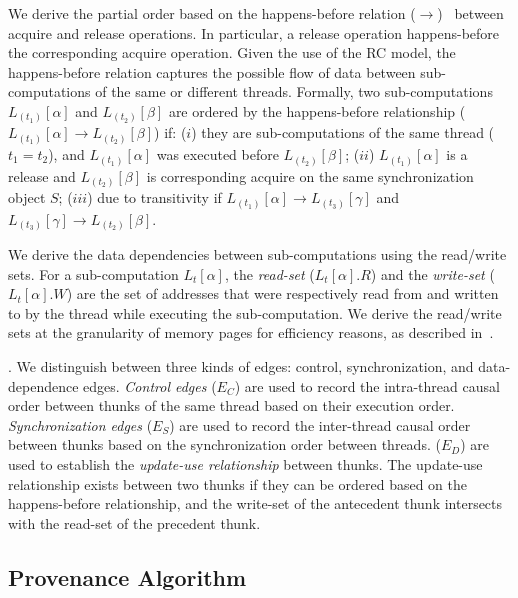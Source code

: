 We derive the partial order based on the happens-before relation
($\rightarrow$)~\cite{djit,fast-track-pldi} between acquire and release operations. In particular, a release
operation happens-before the corresponding acquire operation. Given
the use of the RC model, the happens-before relation
captures the possible flow of data between sub-computations of the same or different threads.
Formally, two sub-computations $L_{(t_1)}[\alpha]$ and
$L_{(t_2)}[\beta]$ are ordered by the happens-before relationship ($L_{(t_1)}[\alpha] \rightarrow
L_{(t_2)}[\beta]$) if:  ($i$)  they are sub-computations of the
same thread ($t_1 = t_2$), and $L_{(t_1)}[\alpha]$ was executed before $L_{(t_2)}[\beta]$; ($ii$)  $L_{(t_1)}[\alpha]$  is a release and $L_{(t_2)}[\beta]$ is corresponding acquire on the same synchronization object $S$; ($iii$) due to transitivity if  
 $L_{(t_1)}[\alpha] \rightarrow L_{(t_3)}[\gamma] $ and $L_{(t_3)}[\gamma]  \rightarrow L_{(t_2)}[\beta]$.


 We derive the data dependencies between sub-computations using the read/write sets. For a sub-computation $L_t[\alpha]$, the {\em read-set}
($L_t[\alpha].R$) and the {\em write-set} ($L_t[\alpha].W$) are the set of
addresses that were respectively read from and written to by
the thread while executing the sub-computation. We derive the read/write sets at the granularity of memory pages for efficiency reasons, as described in~.

.
We distinguish between three kinds of edges: control, synchronization, and data-dependence edges.
{\em Control edges} ($E_{C}$) are used to record the intra-thread causal order between thunks of the same thread
based on their execution order. {\em Synchronization edges}  ($E_{S}$) are
used to record the inter-thread causal order between thunks based on the synchronization order between threads. ($E_{D}$) are used to establish the {\em update-use relationship} between thunks. The update-use relationship exists between two thunks if they can be  ordered based on the happens-before relationship, and the write-set of the  antecedent thunk intersects with the read-set of the precedent thunk.



 
 
 \subsection{ Provenance Algorithm}


